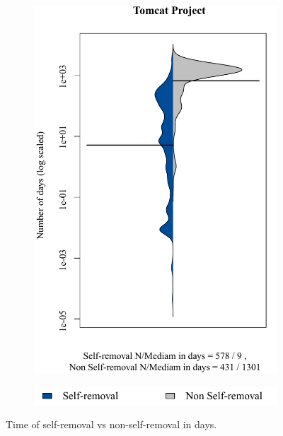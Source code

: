 \begin{figure}[t]
\begin{subfigure}[b]{0.195\textwidth}
		\includegraphics[width=\textwidth]{ben_Tomcat.pdf}
		\label{fig:removal_comparison_tomcat} 
	\end{subfigure}
	\begin{subfigure}[b]{0.40\textwidth}
		\includegraphics[width=\textwidth]{legend.pdf}
	\end{subfigure}
	\caption{Time of self-removal vs non-self-removal in days.}
	\label{fig:removal_self_vs_nonself}
\end{figure}







